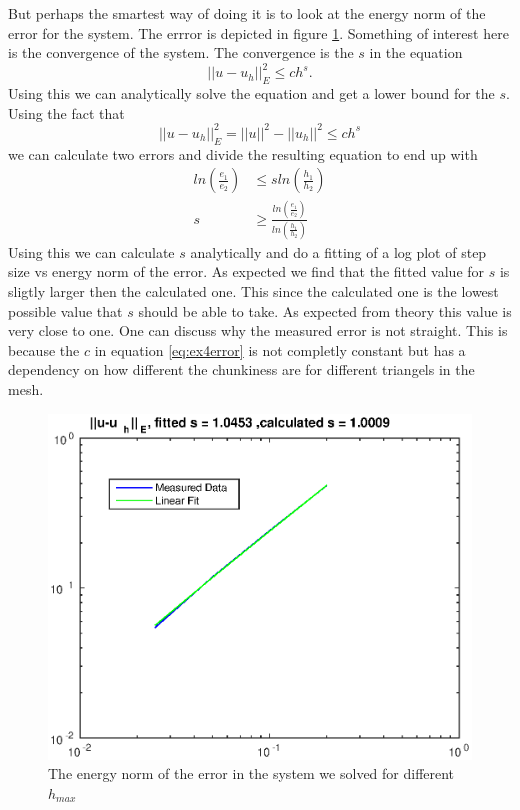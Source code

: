 \documentclass[11pt]{article}
\begin{document}
But perhaps the smartest way of doing it is to look at the energy norm of the error for the system. The errror is depicted in figure \ref{fig:ex4error}. Something of interest here is the convergence of the system. The convergence is the $s$ in the equation
\begin{equation}
	||u-u_h||^2_E \leq c h^s.
	\label{eq:errorBounds}
\end{equation}
Using this we can analytically solve the equation and get a lower bound for the $s$. Using the fact that 
\begin{equation}
	||u-u_h||^2_E = ||u||^2 - ||u_h||^2 \leq c h^s \label{eq:error}
\end{equation}
we can calculate two errors and divide the resulting equation to end up with 
\begin{align}
	ln(\frac{e_1}{e_2}) &\leq s ln(\frac{h_1}{h_2}) \\
	s &\geq \frac{ln(\frac{e_1}{e_2})}{ln(\frac{h_1}{h_2})} \label{eq:findS}
\end{align}
Using this we can calculate $s$ analytically and do a fitting of a log plot of step size vs energy norm of the error. As expected we find that the fitted value for $s$ is sligtly larger then the calculated one. This since the calculated one is the lowest possible value that $s$ should be able to take. As expected from theory this value is very close to one. One can discuss why the measured error is not straight. This is because the $c$ in equation \ref{eq:ex4error} is not completly constant but has a dependency on how different the chunkiness are for different triangels in the mesh. 
\begin{figure}[H]
	\centering
	\includegraphics[width=1\textwidth]{../ex4/error}
	\caption{The energy norm of the error in the system we solved for different $h_{max}$}
	\label{fig:ex4error}
\end{figure}
\end{document}
